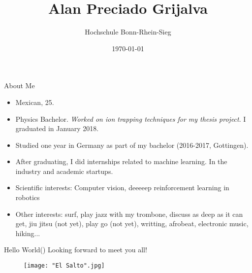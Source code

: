 \documentclass{beamer}
\title[Introduction]{Alan Preciado Grijalva}
\author{Hochschule Bonn-Rhein-Sieg}
\institute{Master in Autonomous Systems}
\date{\today}
\begin{document}
\frame{\titlepage}


\begin{frame}{About Me}
\begin{itemize}
    \item Mexican, 25.
    \item Physics Bachelor. \emph {Worked on ion trapping techniques for my thesis project}. I graduated in January 2018. 
    \item Studied one year in Germany as part of my bachelor (2016-2017, Gottingen).
    \item After graduating, I did internships related to machine learning. In the industry and academic startups.
    \item Scientific interests: Computer vision, deeeeep reinforcement learning in robotics
    \item Other interests: surf, play jazz with my trombone, discuss as deep as it can get, jiu jitsu (not yet), play go (not yet), writting, afrobeat, electronic music, hiking...\\
\end{itemize}
\end{frame}


\begin{frame}{Hello World()}
	Looking forward to meet you all!
    \begin{figure}
	\texttt{[image: "El Salto".jpg]}
	\end{figure}
\end{frame}
\end{document}
